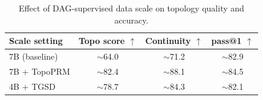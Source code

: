 \begin{table}[!htb]
\centering
\small
\setlength{\tabcolsep}{5pt}
\begin{tabular}{lccc}
\toprule
Scale setting & Topo score $\uparrow$ & Continuity $\uparrow$ & pass@1 $\uparrow$ \\
\midrule
7B (baseline) & {$\sim$}64.0 & {$\sim$}71.2 & {$\sim$}82.9 \\
7B + TopoPRM & {$\sim$}82.4 & {$\sim$}88.1 & {$\sim$}84.5 \\
4B + TGSD     & {$\sim$}78.7 & {$\sim$}84.3 & {$\sim$}82.1 \\
\bottomrule
\end{tabular}
\caption{Effect of DAG-supervised data scale on topology quality and accuracy.}
\label{tab:dag_scaling}
\end{table}
